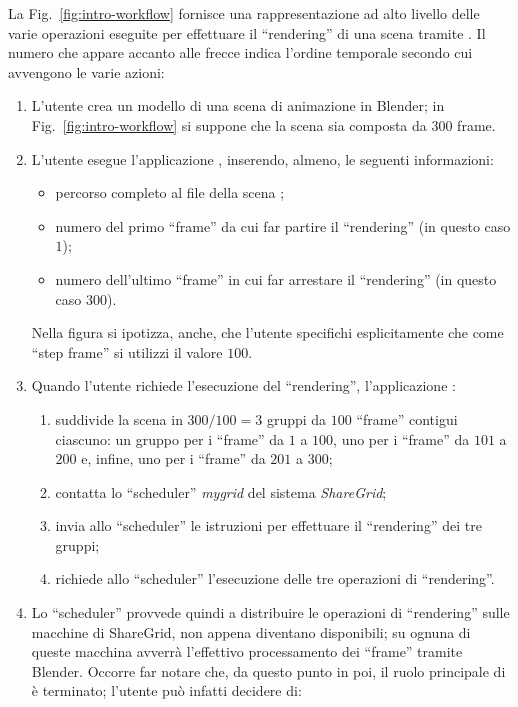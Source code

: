 La Fig.~\ref{fig:intro-workflow} fornisce una rappresentazione ad alto livello delle varie operazioni eseguite per effettuare il ``rendering'' di una scena tramite \mgTheApp{}.
Il numero che appare accanto alle frecce indica l'ordine temporale secondo cui avvengono le varie azioni:
\begin{enumerate}
\item L'utente crea un modello di una scena di animazione in Blender; in Fig.~\ref{fig:intro-workflow} si suppone che la scena sia composta da $300$ frame.
\item L'utente esegue l'applicazione \mgTheApp{}, inserendo, almeno, le seguenti informazioni:
\begin{itemize}
\item percorso completo al file della scena ;
\item numero del primo ``frame'' da cui far partire il ``rendering'' (in questo caso $1$);
\item numero dell'ultimo ``frame'' in cui far arrestare il ``rendering'' (in questo caso $300$).
\end{itemize}
Nella figura si ipotizza, anche, che l'utente specifichi esplicitamente che come ``step frame'' si utilizzi il valore $100$.
\item Quando l'utente richiede l'esecuzione del ``rendering'', l'applicazione \mgTheApp{}:
\begin{enumerate}
\item suddivide la scena in $300/100=3$ gruppi da $100$ ``frame'' contigui ciascuno: un gruppo per i ``frame'' da $1$ a $100$, uno per i ``frame'' da $101$ a $200$ e, infine, uno per i ``frame'' da $201$ a $300$;
\item contatta lo ``scheduler'' \emph{mygrid} del sistema \emph{ShareGrid};
\item invia allo ``scheduler'' le istruzioni per effettuare il ``rendering'' dei tre gruppi;
\item richiede allo ``scheduler'' l'esecuzione delle tre operazioni di ``rendering''.
\end{enumerate}
\item Lo ``scheduler'' provvede quindi a distribuire le operazioni di ``rendering'' sulle macchine di ShareGrid, non appena diventano disponibili; su ognuna di queste macchina avverr\`a l'effettivo processamento dei ``frame'' tramite Blender.
Occorre far notare che, da questo punto in poi, il ruolo principale di \mgTheApp{} \`e terminato; l'utente pu\`o infatti decidere di:
\begin{itemize} 

\end{itemize}
\end{enumerate}
